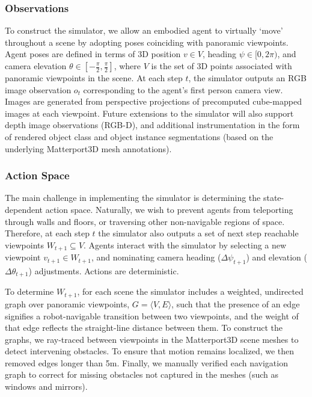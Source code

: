 \documentclass[10pt,twocolumn,letterpaper]{article}
\begin{document}
\subsubsection{Observations}
\label{sec:obs}
To construct the simulator, we allow an embodied agent to virtually `move' throughout a scene by adopting poses coinciding with panoramic viewpoints. Agent poses are defined in terms of 3D position $v \in V$, heading $\psi \in [0, 2\pi)$, and camera elevation $\theta \in [-\frac{\pi}{2}, \frac{\pi}{2}]$, where $V$ is the set of 3D points associated with panoramic viewpoints in the scene. At each step $t$, the simulator outputs an RGB image observation $o_t$ corresponding to the agent's first person camera view. Images are generated from perspective projections of precomputed cube-mapped images at each viewpoint. Future extensions to the simulator will also support depth image observations (RGB-D), and additional instrumentation in the form of rendered object class and object instance segmentations (based on the underlying Matterport3D mesh annotations). 
\subsubsection{Action Space}
\label{sec:action-space}
The main challenge in implementing the simulator is determining the state-dependent action space. Naturally, we wish to prevent agents from teleporting through walls and floors, or traversing other non-navigable regions of space. Therefore, at each step $t$ the simulator also outputs a set of next step reachable viewpoints $W_{t+1} \subseteq V$. Agents interact with the simulator by selecting a new viewpoint $v_{t+1} \in W_{t+1}$, and nominating camera heading ($\Delta \psi_{t+1}$) and elevation ($\Delta \theta_{t+1}$) adjustments. Actions are deterministic.

To determine $W_{t+1}$, for each scene the simulator includes a weighted, undirected graph over panoramic viewpoints, $G = \langle V,E \rangle$, such that the presence of an edge signifies a robot-navigable transition between two viewpoints, and the weight of that edge reflects the straight-line distance between them. To construct the graphs, we ray-traced between viewpoints in the Matterport3D scene meshes to detect intervening obstacles. To ensure that motion remains localized, we then removed edges longer than 5m. Finally, we manually verified each navigation graph to correct for missing obstacles not captured in the meshes (such as windows and mirrors). 
\end{document}
